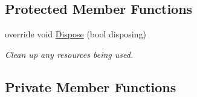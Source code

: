 \subsection*{Protected Member Functions}
\begin{DoxyCompactItemize}
\item 
override void \hyperlink{class__7___doroshenko__forms2__is52_1_1_win_container_a050548a3d83799d8ff193dcbc42ca59f}{Dispose} (bool disposing)
\begin{DoxyCompactList}\small\item\em Clean up any resources being used. \end{DoxyCompactList}\end{DoxyCompactItemize}
\subsection*{Private Member Functions}
